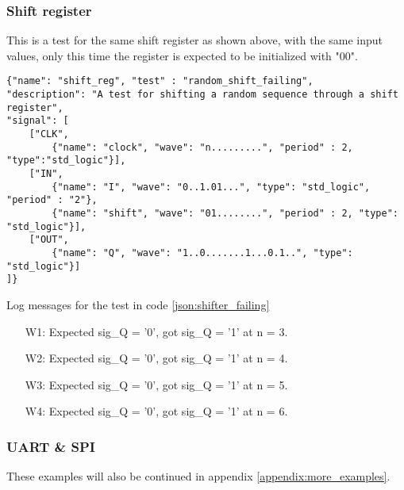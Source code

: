 \subsubsection{Shift register}
This is a test for the same shift register as shown above, with the same input values, only this time the register is expected to be initialized with "00".
\begin{lstlisting}[style=json, caption={Failing functionality test for the shifter design in appendix \ref{appendix:shifter}}, label={json:shifter_failing}]
{"name": "shift_reg", "test" : "random_shift_failing", 
"description": "A test for shifting a random sequence through a shift register", 
"signal": [
	["CLK",
		{"name": "clock", "wave": "n.........", "period" : 2, "type":"std_logic"}],
	["IN",
		{"name": "I", "wave": "0..1.01...", "type": "std_logic", "period" : "2"},
		{"name": "shift", "wave": "01........", "period" : 2, "type": "std_logic"}],
	["OUT",
		{"name": "Q", "wave": "1..0.......1...0.1..", "type": "std_logic"}]
]}
\end{lstlisting}
\begin{customenv}
	\caption{Log messages for the test in code \ref{json:shifter_failing}}
	\begin{itemize}
		\item [W1:] Expected sig\_Q =  '0',  got sig\_Q =  '1' at n = 3.
		\item [W2:] Expected sig\_Q =  '0',  got sig\_Q =  '1' at n = 4.
		\item [W3:] Expected sig\_Q =  '0',  got sig\_Q =  '1' at n = 5.
		\item [W4:] Expected sig\_Q =  '0',  got sig\_Q =  '1' at n = 6.
		
	\end{itemize}
\end{customenv}
\newpage
\subsubsection{UART \& SPI}
These examples will also be continued in appendix \ref{appendix:more_examples}.
